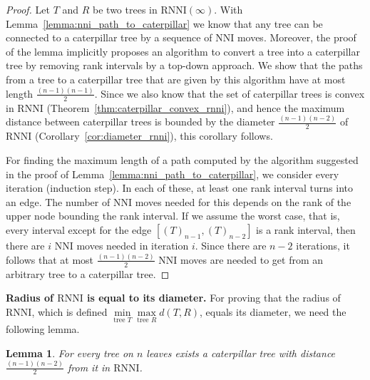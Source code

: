 \documentclass[11pt]{amsart}
\newtheorem{lemma}{Lemma}
\newcommand{\rnni}{\mathrm{RNNI}}
\newcommand{\nni}{\mathrm{NNI}}
\newcommand{\summary}[1]{\textbf{#1}} %
\begin{document}
\begin{proof}
	Let $T$ and $R$ be two trees in $\rnni(\infty)$.
	With Lemma~\ref{lemma:nni_path_to_caterpillar} we know that any tree can be connected to a caterpillar tree by a sequence of $\nni$ moves.
	Moreover, the proof of the lemma implicitly proposes an algorithm to convert a tree into a caterpillar tree by removing rank intervals by a top-down approach.
	We show that the paths from a tree to a caterpillar tree that are given by this algorithm have at most length $\frac{(n-1)(n-1)}{2}$.
	Since we also know that the set of caterpillar trees is convex in $\rnni$ (Theorem~\ref{thm:caterpillar_convex_rnni}), and hence the maximum distance between caterpillar trees is bounded by the diameter $\frac{(n-1)(n-2)}{2}$ of $\rnni$ (Corollary~\ref{cor:diameter_rnni}), this corollary follows.

	For finding the maximum length of a path computed by the algorithm suggested in the proof of Lemma~\ref{lemma:nni_path_to_caterpillar}, we consider every iteration (induction step).
	In each of these, at least one rank interval turns into an edge.
	The number of $\nni$ moves needed for this depends on the rank of the upper node bounding the rank interval.
	If we assume the worst case, that is, every interval except for the edge $[(T)_{n-1},(T)_{n-2}]$ is a rank interval, then there are $i$ $\nni$ moves needed in iteration $i$.
	Since there are $n-2$ iterations, it follows that at most $\frac{(n-1)(n-2)}{2}$ $\nni$ moves are needed to get from an arbitrary tree to a caterpillar tree.
\end{proof}

\summary{Radius of $\rnni$ is equal to its diameter.}
For proving that the radius of $\rnni$, which is defined $\min\limits_{\text{tree } T}\max\limits_{\text{tree }R} d(T,R)$, equals its diameter, we need the following lemma.

\begin{lemma}
	For every tree on $n$ leaves exists a caterpillar tree with distance $\frac{(n-1)(n-2)}{2}$ from it in $\rnni$.
	\label{lemma:max_dist_ctree}
\end{lemma}
\end{document}
